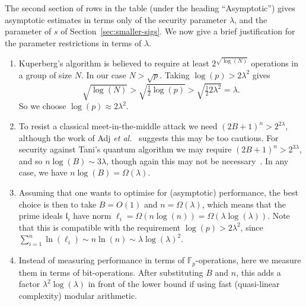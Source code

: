\documentclass{llncs}
\newcommand{\F}{\mathbb{F}}
\renewcommand{\l}{\mathfrak{l}}
\begin{document}
The second section of rows in the table (under the heading ``Asymptotic'') gives asymptotic estimates in terms only of the security parameter $\lambda$, and the parameter of $s$ of Section~\ref{sec:smaller-sigs}.
We now give a brief justification for the parameter restrictions in terms of $\lambda$.
\begin{enumerate}
\item Kuperberg's algorithm is believed to require at least $ 2^{\sqrt{\log(N)}}$ operations in a group of size $N$. In our case $N > \sqrt{p}$. Taking $\log(p) > 2 \lambda^2$ gives 
\[
   \sqrt{ \log(N)} > \sqrt{ \tfrac{1}{2} \log(p) } > \sqrt{ \tfrac{1}{2} 2 \lambda^2 } = \lambda.
\]
So we choose $\log(p) \approx 2 \lambda^2$.

\item 
To resist a classical meet-in-the-middle attack we need $(2B+1)^n > 2^{2 \lambda}$, although the work of Adj \emph{et al.}~\cite{adj+menezes+al-isogenies} suggests this may be too cautious.
For security against Tani's quantum algorithm we may require $(2B+1)^n > 2^{3 \lambda}$, and so $n \log(B) \sim 3 \lambda$, though again this may not be necessary~\cite{cryptoeprint:2019:103}. In any case, we have $n \log(B) = \Omega( \lambda )$.



%

\item Assuming that one wants to optimise for (asymptotic) performance, the best choice is then to take $B=O(1)$ and $n=\Omega(\lambda)$, which means that the prime ideals $\l_i$ have norm $\ell_i = \Omega( n \log(n)) =  \Omega( \lambda \log(\lambda))$. Note that this is compatible with the requirement $\log(p)>2\lambda^2$, since $\sum_{i=1}^n\ln(\ell_i)\sim n\ln(n) \sim \lambda\log(\lambda)^2$.

\item Instead of measuring performance in terms of $\F_p$-operations, here we measure them in terms of bit-operations. After substituting $B$ and $n$, this adds a factor $\lambda^2\log(\lambda)$ in front of the lower bound if using fast (quasi-linear complexity) modular arithmetic.

\end{enumerate}
\end{document}
